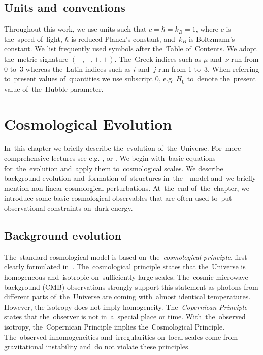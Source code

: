 \section*{Units and~conventions}
Throughout this work, we use units such that $c=\hbar=k_B=1$, where $c$ is the~speed of~light, $\hbar$ is reduced Planck's constant, and~$k_B$ is Boltzmann's constant. We list frequently used symbols after the~Table of~Contents. We adopt the~metric signature $(-, +, +, +)$. The~Greek indices such as $\mu$ and~$\nu$ run from 0 to~3 whereas the~Latin indices such as $i$ and~$j$ run from 1 to~3. When referring to~present values of~quantities we use subscript $0$, e.g. $H_0$ to~denote the~present value of~the~Hubble parameter.\clearpage{}
\clearpage{}\chapter{Cosmological Evolution}
\label{chpt:cosmo_evol}
In~this chapter we briefly describe the~evolution of~the~Universe. For~more comprehensive lectures see e.g. \textcite{Ref:Weinberg}, \textcite{2002col.luc..cosmology} or \textcite{2010deto.book.....A}. We begin with~basic equations for~the~evolution and~apply them to~cosmological scales. We describe background evolution and~formation of~structures in~the~\LCDM\ model and~we briefly mention non-linear cosmological perturbations. At~the~end of~the~chapter, we introduce some basic cosmological observables that are often used to~put observational constraints on~dark energy.

\section{Background evolution}
The~standard cosmological model is based on~the~\textit{cosmological principle}, first clearly formulated in~\textcite{1687pnpm.book.....N}. The~cosmological principle states that the~Universe is homogeneous and~isotropic on~sufficiently large scales. The~cosmic microwave background (CMB) observations strongly support this statement as photons from different parts of~the~Universe are coming with~almost identical temperatures. However, the isotropy does not imply homogeneity. The~\textit{Copernican Principle} states that the~observer is not in~a~special place or time. With~the~observed isotropy, the~Copernican Principle implies the~Cosmological Principle. The~observed inhomogeneities and~irregularities on~local scales come from gravitational instability and~do not violate these principles.
